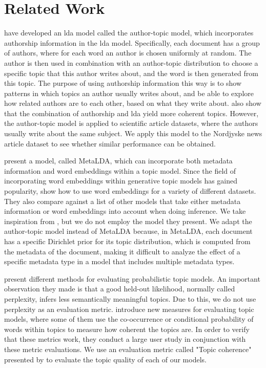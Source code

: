 \section{Related Work}\label{sec:related_work}

\citet{author_topic_2012} have developed an \gls{lda} model called the author-topic model, which incorporates authorship information in the \gls{lda} model.
Specifically, each document has a group of authors, where for each word an author is chosen uniformly at random.
The author is then used in combination with an author-topic distribution to choose a specific topic that this author writes about, and the word is then generated from this topic.
The purpose of using authorship information this way is to show patterns in which topics an author usually writes about, and be able to explore how related authors are to each other, based on what they write about.
\citeauthor{author_topic_2012} also show that the combination of authorship and \gls{lda} yield more coherent topics.
However, the author-topic model is applied to scientific article datasets, where the authors usually write about the same subject.
We apply this model to the Nordjyske news article dataset to see whether similar performance can be obtained.

\citet{MetaLDA2017} present a model, called MetaLDA, which can incorporate both metadata information and word embeddings within a topic model.
Since the field of incorporating word embeddings within generative topic models has gained popularity\cite{dieng2020topic}, \citet{MetaLDA2017} show how to use word embeddings for a variety of different datasets.
They also compare against a list of other models that take either metadata information or word embeddings into account when doing inference.
We take inspiration from \citet{MetaLDA2017}, but we do not employ the model they present.
We adapt the author-topic model instead of MetaLDA because, in MetaLDA, each document has a specific Dirichlet prior for its topic distribution, which is computed from the metadata of the document, making it difficult to analyze the effect of a specific metadata type in a model that includes multiple metadata types.

\citet{tea_leaves} present different methods for evaluating probabilistic topic models. 
An important observation they made is that a good held-out likelihood, normally called perplexity, infers less semantically meaningful topics.
Due to this, we do not use perplexity as an evaluation metric.
\citet{topic_coherence_2015} introduce new measures for evaluating topic models, where some of them use the co-occurrence or conditional probability of words within topics to measure how coherent the topics are. 
In order to verify that these metrics work, they conduct a large user study in conjunction with these metric evaluations.
We use an evaluation metric called "Topic coherence" presented by \citet{topic_coherence_2015} to evaluate the topic quality of each of our models.

